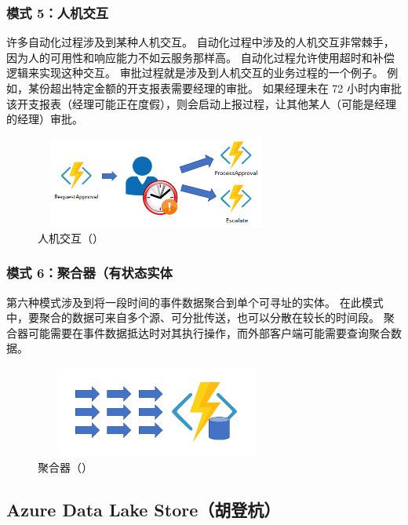 \documentclass[11pt]{article}
\begin{document}
\subsubsection{模式 5：人机交互}
许多自动化过程涉及到某种人机交互。 自动化过程中涉及的人机交互非常棘手，因为人的可用性和响应能力不如云服务那样高。 自动化过程允许使用超时和补偿逻辑来实现这种交互。
审批过程就是涉及到人机交互的业务过程的一个例子。 例如，某份超出特定金额的开支报表需要经理的审批。 如果经理未在 72 小时内审批该开支报表（经理可能正在度假），则会启动上报过程，让其他某人（可能是经理的经理）审批。
\begin{figure}[H]
\begin{flushleft}
\includegraphics[width=8cm, height=3cm]{figs/model5}
\caption{人机交互（\cite{Durable}）}
\end{flushleft}
\end{figure}

\subsubsection{模式 6：聚合器（有状态实体}
第六种模式涉及到将一段时间的事件数据聚合到单个可寻址的实体。 在此模式中，要聚合的数据可来自多个源、可分批传送，也可以分散在较长的时间段。 聚合器可能需要在事件数据抵达时对其执行操作，而外部客户端可能需要查询聚合数据。
\begin{figure}[H]
\begin{flushleft}
\includegraphics[width=8cm, height=3cm]{figs/model6}
\caption{聚合器（\cite{Durable}）}
\end{flushleft}
\end{figure}

\subsection{Azure Data Lake Store（胡登杭）\cite{ramakrishnan2017azure}}
\end{document}
